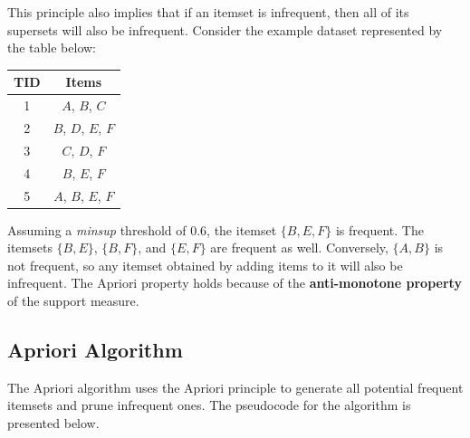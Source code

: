 
This principle also implies that if an itemset is infrequent, then all of its supersets will also be infrequent. Consider the example dataset represented by the table below:

\begin{table}[h]
    \centering
    \begin{tabular}{|c|c|}
    \hline
        TID & Items \\
    \hline
        1 & $A$, $B$, $C$ \\
    \hline
        2 & $B$, $D$, $E$, $F$ \\
    \hline
        3 & $C$, $D$, $F$ \\
    \hline
        4 & $B$, $E$, $F$ \\
    \hline
        5 & $A$, $B$, $E$, $F$ \\
    \hline
    \end{tabular}
\end{table}

Assuming a \textit{minsup} threshold of 0.6, the itemset $\{B,E,F\}$ is frequent. The itemsets $\{B,E\}$, $\{B,F\}$, and $\{E,F\}$ are frequent as well. Conversely, $\{A,B\}$ is not frequent, so any itemset obtained by adding items to it will also be infrequent. The Apriori property holds because of the \textbf{anti-monotone property} of the support measure.


\subsection{Apriori Algorithm}

The Apriori algorithm uses the Apriori principle to generate all potential frequent itemsets and prune infrequent ones. The pseudocode for the algorithm is presented below.

